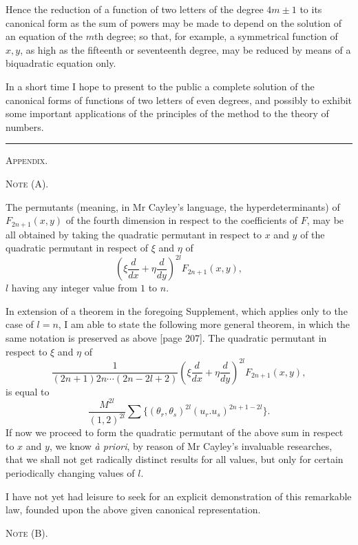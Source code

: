 \documentclass[11pt]{article}
\newcommand{\sourcepage}[1]{\marginpar{\scriptsize p.~#1}}
\begin{document}
{{Hence the reduction of a function of two letters of the degree $4m\pm1$ to its canonical form as the sum of powers may be made to depend on the solution of an equation of the $m$th degree; so that, for example, a symmetrical function of $x,y$, as high as the fifteenth or seventeenth degree, may be reduced by means of a biquadratic equation only.

In a short time I hope to present to the public a complete solution of the canonical forms of functions of two letters of even degrees, and possibly to exhibit some important applications of the principles of the method to the theory of numbers.

\begin{center}\rule{1.5in}{0.4pt}\end{center}

\begin{center}
{\scshape Appendix.}

\smallskip
{\scshape Note (A).}
\end{center}

The permutants (meaning, in Mr Cayley's language, the hyperdeterminants) of $F_{2n+1}(x,y)$ of the fourth dimension in respect to the coefficients of $F$, may be all obtained by taking the quadratic permutant in respect to $x$ and $y$ of the quadratic permutant in respect of $\xi$ and $\eta$ of
\[
 \left(\xi\frac{d}{dx}+\eta\frac{d}{dy}\right)^{2l}F_{2n+1}(x,y),
\]
$l$ having any integer value from $1$ to $n$.

In extension of a theorem in the foregoing Supplement, which applies only to the case of $l=n$, I am able to state the following more general theorem, in which the same notation is preserved as above [page 207]. The quadratic permutant in respect to $\xi$ and $\eta$ of
\[
 \frac{1}{(2n+1)2n\cdots(2n-2l+2)}
 \left(\xi\frac{d}{dx}+\eta\frac{d}{dy}\right)^{2l}F_{2n+1}(x,y),
\]
is equal to
\[
 \frac{M^{2l}}{(1,2)^{2l}}\sum\{(\theta_r,\theta_s)^{2l}(u_r.u_s)^{2n+1-2l}\}.
\]
If now we proceed to form the quadratic permutant of the above sum in respect to $x$ and $y$, we know \emph{\`a priori}, by reason of Mr Cayley's invaluable researches, that we shall not get radically distinct results for all values, but only for certain periodically changing values of $l$.

\sourcepage{215}
I have not yet had leisure to seek for an explicit demonstration of this remarkable law, founded upon the above given canonical representation.

\begin{center}{\scshape Note (B).}\end{center}

}}
\end{document}
